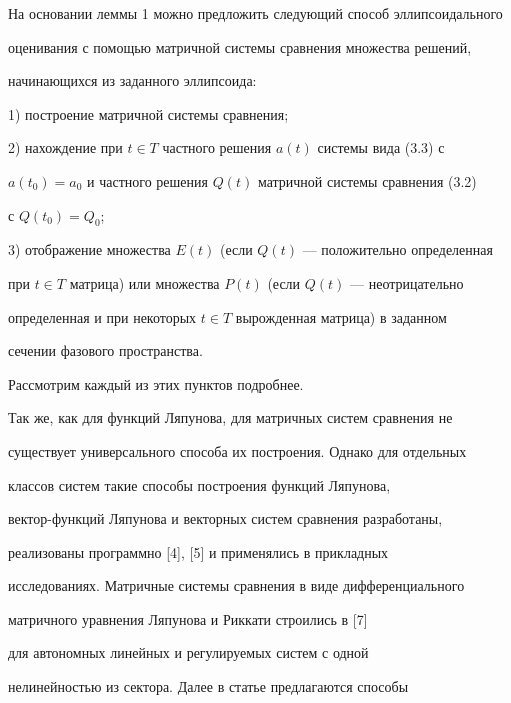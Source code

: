  


На основании леммы 1 можно предложить следующий способ эллипсоидального 


оценивания с помощью матричной системы сравнения множества решений, 


начинающихся из заданного эллипсоида: 


 


1) построение матричной системы сравнения; 


 


2) нахождение при $t\in T$ частного решения $a(t)$ системы вида (3.3) с 


$a(t_0)=a_0$ и частного решения $Q(t)$ матричной системы сравнения (3.2) 


с $Q(t_0)=Q_0$; 


 


3) отображение множества $E(t)$ (если $Q(t)$ --- положительно определенная 


при $t\in T$ матрица) или множества $P(t)$ (если $Q(t)$ --- неотрицательно 


определенная и при некоторых $t\in T$ вырожденная матрица) в заданном 


сечении фазового пространства. 


 


Рассмотрим каждый из этих пунктов подробнее. 


 


Так же, как для функций Ляпунова, для матричных систем сравнения не 


существует универсального способа их построения. Однако для отдельных 


классов систем такие способы построения функций Ляпунова, 


вектор-функций Ляпунова и векторных систем сравнения разработаны, 


реализованы программно [4], [5] и применялись в прикладных 


исследованиях. Матричные системы сравнения в виде дифференциального 


матричного уравнения Ляпунова и Риккати строились в [7] 


для автономных линейных и регулируемых систем с одной 


нелинейностью из сектора. Далее в статье предлагаются способы 


